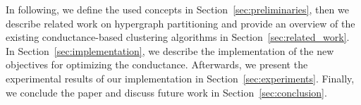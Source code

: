 \documentclass[acmsmall,nonacm,screen,review]{acmart}
\begin{document}
\noindent In following, we define the used concepts in Section~\ref{sec:preliminaries}, 
then we describe related work on hypergraph partitioning and provide an overview
of the existing conductance-based clustering algorithms in Section~\ref{sec:related_work}. In 
Section~\ref{sec:implementation}, we describe the implementation of the new 
objectives for optimizing the conductance. Afterwards, we present the 
experimental results of our implementation in Section~\ref{sec:experiments}. 
Finally, we conclude the paper and discuss future work in Section~\ref{sec:conclusion}.





\end{document}
